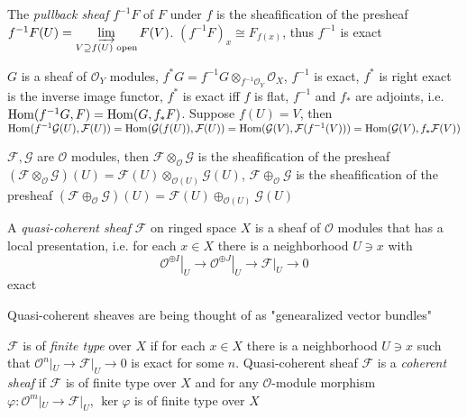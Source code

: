 \documentclass[main]{subfiles}
\begin{document}
\begin{definition}
The \textit{pullback sheaf} $f^{-1}F$ of $F$ under $f$ is the sheafification of the presheaf $f^{-1}F(U)=\displaystyle\varinjlim_{V\supseteq f(U)\text{ open}}F(V)$. $(f^{-1}F)_x\cong F_{f(x)}$, thus $f^{-1}$ is exact
\end{definition}

\begin{definition}
$G$ is a sheaf of $\mathcal O_Y$ modules, $f^*G=f^{-1}G\otimes_{f^{-1}\mathcal O_Y}\mathcal O_X$, $f^{-1}$ is exact, $f^*$ is right exact is the inverse image functor, $f^*$ is exact iff $f$ is flat, $f^{-1}$ and $f_*$ are adjoints, i.e. $\operatorname{Hom}(f^{-1}G,F)=\operatorname{Hom}(G,f_*F)$. Suppose $f(U)=V$, then $\operatorname{Hom}(f^{-1}\mathcal G(U),\mathcal F(U))=\operatorname{Hom}(\mathcal G(f(U)),\mathcal F(U))=\operatorname{Hom}(\mathcal G(V),\mathcal F(f^{-1}(V)))=\operatorname{Hom}(\mathcal G(V),f_*\mathcal F(V))$
\end{definition}

\begin{definition}
$\mathcal F,\mathcal G$ are $\mathcal O$ modules, then $\mathcal F\otimes_{\mathcal O}\mathcal G$ is the sheafification of the presheaf $(\mathcal F\otimes_{\mathcal O}\mathcal G)(U)=\mathcal F(U)\otimes_{\mathcal O(U)}\mathcal G(U)$, $\mathcal F\oplus_{\mathcal O}\mathcal G$ is the sheafification of the presheaf $(\mathcal F\oplus_{\mathcal O}\mathcal G)(U)=\mathcal F(U)\oplus_{\mathcal O(U)}\mathcal G(U)$
\end{definition}

\begin{definition}
A \textit{quasi-coherent sheaf} $\mathcal F$ on ringed space $X$ is a sheaf of $\mathcal O$ modules that has a local presentation, i.e. for each $x\in X$ there is a neighborhood $U\ni x$ with
\[\left.\mathcal O^{\oplus I}\right|_{U}\to\left.\mathcal O^{\oplus J}\right|_{U}\to\mathcal F|_{U}\to0\]
exact
\end{definition}

\begin{note}
Quasi-coherent sheaves are being thought of as "genearalized vector bundles"
\end{note}

\begin{definition}
$\mathcal F$ is of \textit{finite type} over $X$ if for each $x\in X$ there is a neighborhood $U\ni x$ such that $\mathcal O^n|_{U}\to\mathcal F|_U\to0$ is exact for some $n$. Quasi-coherent sheaf $\mathcal F$ is a \textit{coherent sheaf} if $\mathcal F$ is of finite type over $X$ and for any $\mathcal O$-module morphism $\varphi:\mathcal O^m|_U\to\mathcal F|_U$, $\ker\varphi$ is of finite type over $X$
\end{definition}
\end{document}
